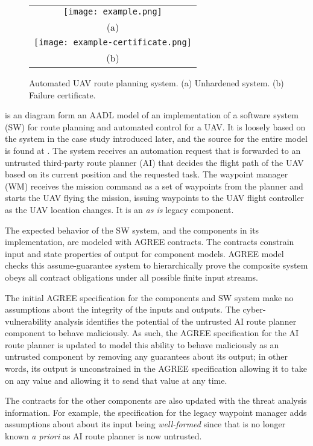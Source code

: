 \begin{figure*}
  \begin{center}
    \begin{tabular}{c}
      \texttt{[image: example.png]} \\
      (a) \\
      \texttt{[image: example-certificate.png]} \\
      (b)
    \end{tabular}
  \end{center}
\caption{Automated UAV route planning system. (a) Unhardened system. (b) Failure certificate.}
\label{fig:example}
\end{figure*}

 is an diagram form an AADL model of an implementation of a software system (SW) for route planning and automated control for a UAV. It is loosely based on the system in the case study introduced later, and the source for the entire model is found at \cite{repo}. The system receives an automation request that is forwarded to an untrusted third-party route planner (AI) that decides the flight path of the UAV based on its current position and the requested task. The waypoint manager (WM) receives the mission command as a set of waypoints from the planner and starts the UAV flying the mission, issuing waypoints to the UAV flight controller as the UAV location changes. It is an \emph{as is} legacy component.

The expected behavior of the SW system, and the components in its implementation, are modeled with AGREE contracts. The contracts constrain input and state properties of output for component models. AGREE model checks this assume-guarantee system to hierarchically prove the composite system obeys all contract obligations under all possible finite input streams. 

The initial AGREE specification for the components and SW system make no assumptions about the integrity of the inputs and outputs. The cyber-vulnerability analysis identifies the potential of the untrusted AI route planner component to behave maliciously. As such, the AGREE specification for the AI route planner is updated to model this ability to behave maliciously as an untrusted component by removing any guarantees about its output; in other words, its output is unconstrained in the AGREE specification allowing it to take on any value and allowing it to send that value at any time.

The contracts for the other components are also updated with the threat analysis information. For example, the specification for the legacy waypoint manager adds assumptions about about its input being \emph{well-formed} since that is no longer known \emph{a priori} as AI route planner is now untrusted. 

